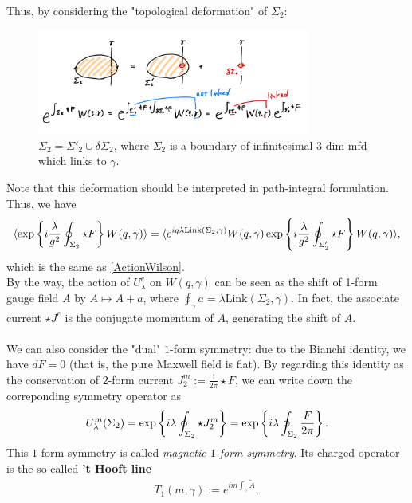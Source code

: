 \documentclass{ltjsarticle}
\theoremstyle{mystyle} %
\numberwithin{equation}{section}
\begin{document}
Thus, by considering the "topological deformation" of $\Sigma_2$: 
\begin{figure}[H]
    \centering
    \includegraphics[width=0.8\textwidth]{ActionToWilsonLine.jpg}
    \caption{$\Sigma_2=\Sigma'_2\cup \delta \Sigma_2$, where $\Sigma_2$ is a boundary of infinitesimal $3$-dim mfd which links to $\gamma$. }
    \label{ActionToWlison}
\end{figure}
\noindent
Note that this deformation should be interpreted in path-integral formulation. Thus, we have
\begin{align}
    \langle{\exp\left\{{i\frac{\lambda}{g^2}\oint_{\Sigma_2}\star F}\right\}W(q, \gamma)}\rangle
    =\langle{e^{iq\lambda\mathrm{Link}(\Sigma_2, \gamma)}
    W(q, \gamma)\exp\left\{{i\frac{\lambda}{g^2}\oint_{\Sigma'_2}\star F}\right\}W(q, \gamma)}\rangle, 
\label{WlisonLineCharge}
\end{align}
which is the same as \eqref{ActionWilson}. \\
 By the way, the action of $U^e_\lambda$ on $W(q, \gamma)$ can be seen as the shift of 1-form gauge field $A$ by 
 $A\mapsto A + a$, where $\oint_{\gamma} a =\lambda \mathrm{Link}(\Sigma_2, \gamma)$. 
 In fact, the associate current $\star J^e$ is the conjugate momentum of $A$, generating the shift of $A$. \\
 \\
 We can also consider the "dual" $1$-form symmetry: due to the Bianchi identity, we have $dF=0$ (that is, the pure Maxwell field is flat). 
 By regarding this identity as the conservation of $2$-form current $J^{m}_2 :=\frac{1}{2\pi}\star F$, we can write down the correponding symmetry operator as
 \begin{align}
    U^{m}_\lambda(\Sigma_2) = \exp\left\{{i\lambda\oint_{\Sigma_2}\star J^m_2}\right\}
    =\exp\left\{{i\lambda\oint_{\Sigma_2}\frac{F}{2\pi}}\right\}. 
 \label{magnetic1form}
 \end{align}
 This $1$-form symmetry is called \textit{magnetic $1$-form symmetry}. Its charged operator is the so-called \textbf{'t Hooft line}
 \begin{align}
    T_1(m, \gamma) := e^{im\int_{\gamma}\tilde{A}}, 
 \label{tHooft}
 \end{align}
\end{document}
